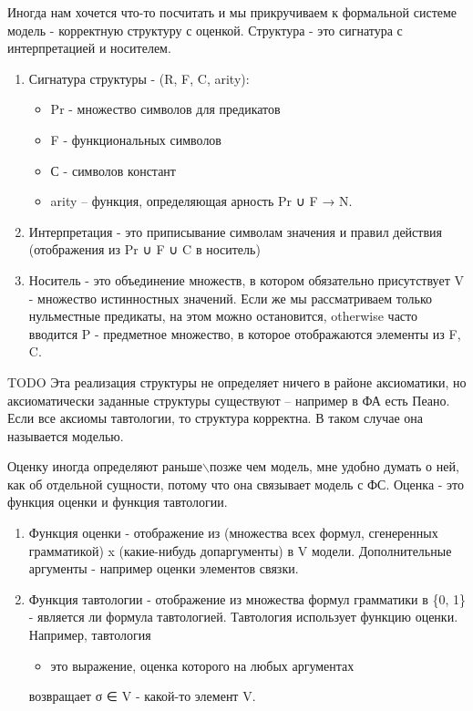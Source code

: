 \documentclass[11pt]{article}
\begin{document}
Иногда нам хочется что-то посчитать и мы прикручиваем к
формальной системе модель - корректную структуру с оценкой.
Структура - это сигнатура с интерпретацией и носителем.
\begin{enumerate}
\item Сигнатура структуры - (R, F, C, arity):
\begin{itemize}
\item Pr - множество символов для предикатов
\item F - функциональных символов
\item С - символов констант
\item arity – функция, определяющая арность Pr ∪ F → N.
\end{itemize}
\item Интерпретация - это приписывание символам значения
и правил действия (отображения из Pr ∪ F ∪ C в носитель)
\item Носитель - это объединение множеств, в котором обязательно
присутствует V - множество истинностных значений. Если же
мы рассматриваем только нульместные предикаты, на этом
можно остановится, otherwise часто вводится P - предметное
множество, в которое отображаются элементы из F, C.
\end{enumerate}
TODO Эта реализация структуры не определяет ничего в районе
аксиоматики, но аксиоматически заданные структуры существуют
– например в ФА есть Пеано.
Если все аксиомы тавтологии, то структура корректна.
В таком случае она называется моделью.

Оценку иногда определяют раньше$\backslash$позже чем модель, мне
удобно думать о ней, как об отдельной сущности, потому что
она связывает модель с ФС.
Оценка - это функция оценки и функция тавтологии.
\begin{enumerate}
\item Функция оценки - отображение из (множества всех формул,
сгенеренных грамматикой) x (какие-нибудь допаргументы)
в V модели. Дополнительные аргументы - например оценки
элементов связки.
\item Функция тавтологии - отображение из множества формул
грамматики в \{0, 1\} - является ли формула тавтологией.
Тавтология использует функцию оценки. Например, тавтология
\begin{itemize}
\item это выражение, оценка которого на любых аргументах
\end{itemize}
возвращает σ ∈ V - какой-то элемент V.
\end{enumerate}
\end{document}
